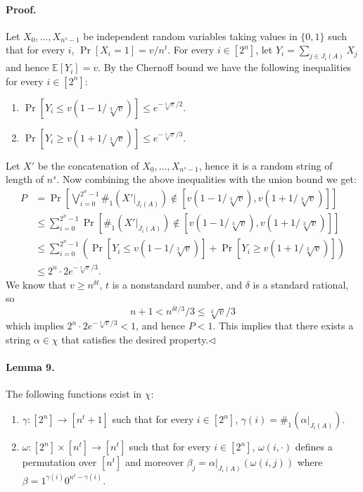 \paragraph{Proof.} Let $X_0,\ldots,X_{n^s-1}$ be independent random variables taking values in $\{0,1\}$ such that for every $i$, $\Pr[X_i=1]=v/n^t$. For every $i\in[2^n]$, let $Y_i=\sum_{j\in J_i(A)}X_j$ and hence $\mathbb E[Y_i]=v$.
By the Chernoff bound we have the following inequalities for every $i\in[2^n]$:
\begin{enumerate}
\item $\Pr[Y_i\leq v(1-1/\sqrt[3]v)]\leq e^{-\sqrt[3]v/2}$.
\item $\Pr[Y_i\geq v(1+1/\sqrt[3]v)]\leq e^{-\sqrt[3]v/3}$.
\end{enumerate}
Let $X'$ be the concatenation of $X_0,\ldots,X_{n^s-1}$, hence it is a random string of length of $n^s$. Now combining the above inequalities with the union bound we get:
\begin{align*}
P&=\Pr\left[\bigvee_{i=0}^{2^n-1}\#_1(X'|_{J_i(A)})\notin[v(1-1/\sqrt[3]v),v(1+1/\sqrt[3]v)]\right]\\
&\leq\sum_{i=0}^{2^n-1}\Pr[\#_1(X'|_{J_i(A)})\notin[v(1-1/\sqrt[3]v),v(1+1/\sqrt[3]v)]]\\
&\leq\sum_{i=0}^{2^n-1}(\Pr[Y_i\leq v(1-1/\sqrt[3]v)]+\Pr[Y_i\geq v(1+1/\sqrt[3]v)])\\
&\leq2^n\cdot2e^{-\sqrt[3]v/3}.
\end{align*}
We know that $v\geq n^{\delta t}$, $t$ is a nonstandard number, and $\delta$ is a standard rational, so
\[n+1<n^{\delta t/3}/3\leq\sqrt[3]v/3\]
which implies $2^n\cdot2e^{-\sqrt[3]v/3}<1$, and hence $P<1$. This implies that there exists a string $\alpha\in\chi$ that satisfies the desired property.\hfill$\triangleleft$
\paragraph{Lemma 9.} The following functions exist in $\chi$:
\begin{enumerate}
\item $\gamma:[2^n]\to[n^t+1]$ such that for every $i\in[2^n]$, $\gamma(i)=\#_1(\alpha|_{J_i(A)})$.
\item $\omega:[2^n]\times[n^t]\to[n^t]$ such that for every $i\in[2^n]$, $\omega(i,\cdot)$ defines a permutation over $[n^t]$ and moreover $\beta_j=\alpha|_{J_i(A)}(\omega(i,j))$ where $\beta=1^{\gamma(i)}0^{n^t-\gamma(i)}$.
\end{enumerate}
